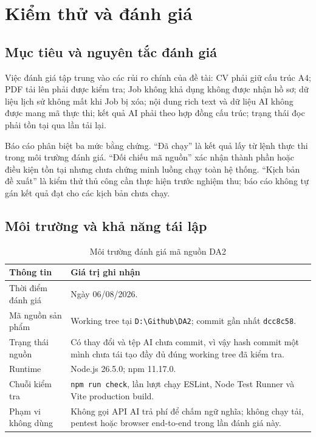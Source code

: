 \chapter{Kiểm thử và đánh giá}

\section{Mục tiêu và nguyên tắc đánh giá}

Việc đánh giá tập trung vào các rủi ro chính của đề tài: CV phải giữ cấu trúc A4; PDF tải lên phải được kiểm tra; Job không khả dụng không được nhận hồ sơ; dữ liệu lịch sử không mất khi Job bị xóa; nội dung rich text và dữ liệu AI không được mang mã thực thi; kết quả AI phải theo hợp đồng cấu trúc; trạng thái đọc phải tồn tại qua lần tải lại.

Báo cáo phân biệt ba mức bằng chứng. ``Đã chạy'' là kết quả lấy từ lệnh thực thi trong môi trường đánh giá. ``Đối chiếu mã nguồn'' xác nhận thành phần hoặc điều kiện tồn tại nhưng chưa chứng minh luồng chạy toàn hệ thống. ``Kịch bản đề xuất'' là kiểm thử thủ công cần thực hiện trước nghiệm thu; báo cáo không tự gán kết quả đạt cho các kịch bản chưa chạy.

\section{Môi trường và khả năng tái lập}

\begin{table}[H]
    \centering
    \small
    \begin{tabularx}{\textwidth}{|p{}|Y|} \hline
        \textbf{Thông tin} & \textbf{Giá trị ghi nhận} \\ \hline
        Thời điểm đánh giá & Ngày 06/08/2026. \\ \hline
        Mã nguồn sản phẩm & Working tree tại \texttt{D:\textbackslash Github\textbackslash DA2}; commit gần nhất \texttt{dcc8c58}. \\ \hline
        Trạng thái nguồn & Có thay đổi và tệp AI chưa commit, vì vậy hash commit một mình chưa tái tạo đầy đủ đúng working tree đã kiểm tra. \\ \hline
        Runtime & Node.js 26.5.0; npm 11.17.0. \\ \hline
        Chuỗi kiểm tra & \texttt{npm run check}, lần lượt chạy ESLint, Node Test Runner và Vite production build. \\ \hline
        Phạm vi không dùng & Không gọi API AI trả phí để chấm ngữ nghĩa; không chạy tải, pentest hoặc browser end-to-end trong lần đánh giá này. \\ \hline
    \end{tabularx}
    \caption{Môi trường đánh giá mã nguồn DA2}
    \label{tab:test-environment}
\end{table}


